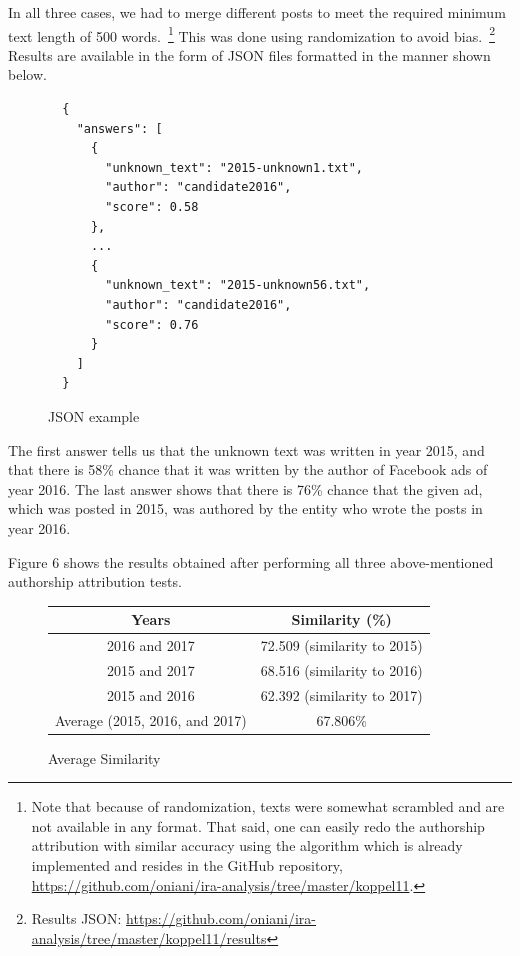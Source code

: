 \documentclass{article}
\begin{document}
In all three cases, we had to merge different posts to meet the required
minimum text length of 500 words.~\footnote{Note that because of randomization,
texts were somewhat scrambled and are not available in any format. That said,
one can easily redo the authorship attribution with similar accuracy using the
algorithm which is already implemented and resides in the GitHub repository,
\url{https://github.com/oniani/ira-analysis/tree/master/koppel11}.} This was
done using randomization to avoid bias.~\footnote{Results JSON:
\url{https://github.com/oniani/ira-analysis/tree/master/koppel11/results}}
Results are available in the form of JSON files formatted in the manner shown
below.

\begin{figure}[H]
  \begin{verbatim}
  {
    "answers": [
      {
        "unknown_text": "2015-unknown1.txt",
        "author": "candidate2016",
        "score": 0.58
      },
      ...
      {
        "unknown_text": "2015-unknown56.txt",
        "author": "candidate2016",
        "score": 0.76
      }
    ]
  }
  \end{verbatim}
  \caption{JSON example}
\end{figure}

The first answer tells us that the unknown text was written in year 2015, and
that there is 58\% chance that it was written by the author of Facebook ads of
year 2016. The last answer shows that there is 76\% chance that the given ad,
which was posted in 2015, was authored by the entity who wrote the posts in
year 2016.

\medskip

Figure 6 shows the results obtained after performing all three above-mentioned
authorship attribution tests.

\begin{figure}[H]
  \centering
  \begin{tabular}{*{2}{c}}
    \toprule
    Years & Similarity (\%)\\
    \midrule
    2016 and 2017 & 72.509 (similarity to 2015)\\
    \midrule
    2015 and 2017 & 68.516 (similarity to 2016)\\
    \midrule
    2015 and 2016 & 62.392 (similarity to 2017)\\
    \midrule
    Average (2015, 2016, and 2017) & 67.806\%\\
    \bottomrule
  \end{tabular}
  \caption{Average Similarity}
\end{figure}
\end{document}

